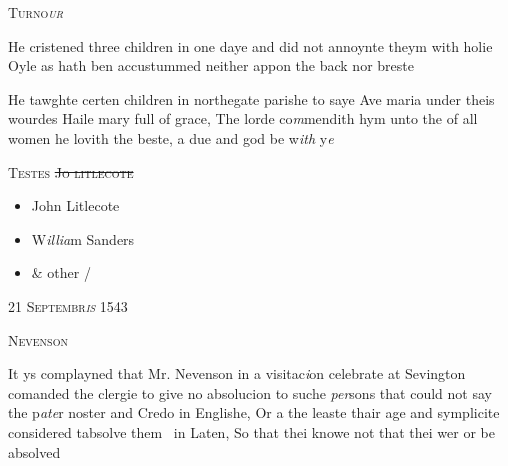 \documentclass[12pt, a4paper]{book}
\begin{document}
               
				\begin{center} \begin{large} {\scshape Turno\textit{ur}} \end{large} \end{center}
			

	
		
				\marginpar[\vspace{0.5cm}{\textcolor{Gray}{ceremonies}}]{}
			
		
				\marginpar[\vspace{0.5cm}{\textcolor{Gray}{n}}]{}
			
		
		\ifthenelse{\isodd{\thepage}}
		{\reversemarginpar}
		{\normalmarginpar}
		He cristened three children in one daye and did not
  annoynte theym with holie Oyle as hath ben accustummed
 neither appon the back nor breste
 
		\ifthenelse{\isodd{\thepage}}
		{\reversemarginpar}
		{\normalmarginpar}
		He tawghte certen children in northegate parishe to
 saye Ave maria under theis wourdes Haile mary
 full of grace, The lorde co\textit{m}mendith hym unto the
 of all women he lovith the beste, a due and god be w\textit{ith} y\textit{e}
 
 	\begin{center} {\scshape Testes \sout{Jo litlecote}} \end{center}\begin{itemize}
 		
		 \item[]John Litlecote
		 \item[]W\textit{illia}m Sanders
		 \item[]\& other /
 	\end{itemize}
 
 

            
               
				\begin{center} \begin{large} {\scshape 
                  21 Septembr\textit{is} 1543
               } \end{large} \end{center}
			
               
                  
				\begin{center}  {\scshape Nevenson}  \end{center}
			
               	
		\ifthenelse{\isodd{\thepage}}
		{\reversemarginpar}
		{\normalmarginpar}
		It ys complayned that Mr. Nevenson in a visitac\textit{i}on
 celebrate at Sevington comanded the clergie to give
 no absolucion to suche \textit{per}sons that could not say the
 p\textit{ate}r noster and Credo in Englishe, Or a the leaste
 thair age and symplicite considered tabsolve them 
 in Laten, So that thei knowe not that thei wer or
 be absolved
 
\end{document}
